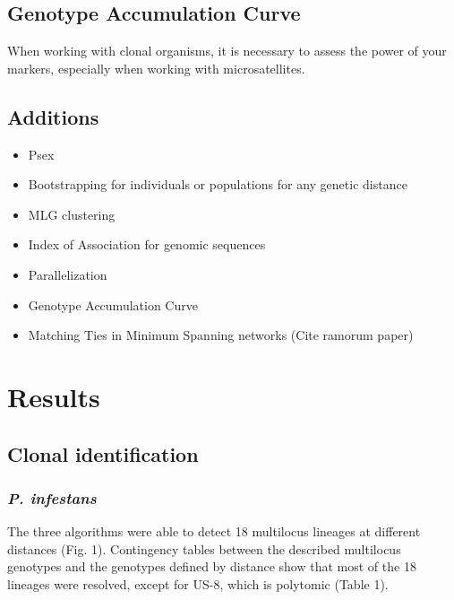 \documentclass{frontiersSCNS} %
\begin{document}
\subsection*{Genotype Accumulation
Curve}\label{genotype-accumulation-curve}

When working with clonal organisms, it is necessary to assess the power
of your markers, especially when working with microsatellites.

\subsection*{Additions}\label{additions}

\begin{itemize}
\itemsep1pt\parskip0pt
\item
  Psex
\item
  Bootstrapping for individuals or populations for any genetic distance
\item
  MLG clustering
\item
  Index of Association for genomic sequences
\item
  Parallelization
\item
  Genotype Accumulation Curve
\item
  Matching Ties in Minimum Spanning networks (Cite ramorum paper)
\end{itemize}

\section*{Results}\label{results}

\subsection*{Clonal identification}\label{clonal-identification}

\subsubsection*{\texorpdfstring{\emph{P.
infestans}}{P. infestans}}\label{p.-infestans-1}

The three algorithms were able to detect 18 multilocus lineages at
different distances (Fig. 1). Contingency tables between the described
multilocus genotypes and the genotypes defined by distance show that
most of the 18 lineages were resolved, except for US-8, which is
polytomic (Table 1).
\end{document}
